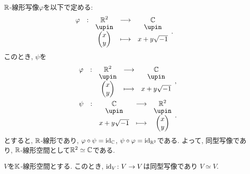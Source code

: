 \begin{example}
  $\mathbb{R}$-線形写像$\varphi$を以下で定める:
  \begin{align*}
    &\shazo{\varphi}{\RR^2}{\CC}{\begin{pmatrix}x\\y\end{pmatrix}}{x+y\sqrt{-1}}.
  \end{align*}
  このとき,
  $\psi$を
  \begin{align*}
    &\shazo{\varphi}{\RR^2}{\CC}{\begin{pmatrix}x\\y\end{pmatrix}}{x+y\sqrt{-1}},\\
   &\shazo{\psi}{\CC}{\RR^2}{x+y\sqrt{-1}}{\begin{pmatrix}x\\y\end{pmatrix}}.
  \end{align*}
  とすると,
  $\mathbb{R}$-線形であり,
  $\varphi\circ \psi=\operatorname{id}_{\mathbb{C}}$,
  $\psi\circ\varphi=\operatorname{id}_{\mathbb{R}^2}$である.
  よって, 同型写像であり,
  $\mathbb{R}$-線形空間として$\mathbb{R}^2\simeq\mathbb{C}$である.
\end{example}

\begin{example}
  $V$を$\mathbb{K}$-線形空間とする.
  このとき,
  $\operatorname{id}_V\colon V\to V$は同型写像であり
  $V\simeq V$.
\end{example}

